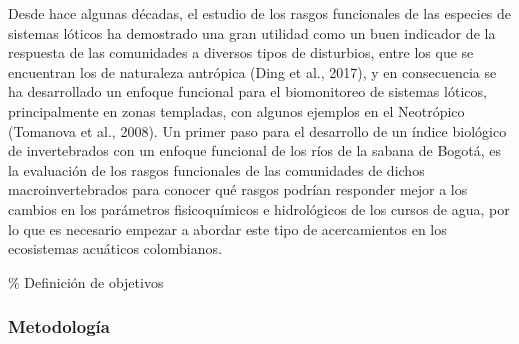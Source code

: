 \documentclass[
]{article}
\begin{document}
Desde hace algunas décadas, el estudio de los rasgos funcionales de las
especies de sistemas lóticos ha demostrado una gran utilidad como un
buen indicador de la respuesta de las comunidades a diversos tipos de
disturbios, entre los que se encuentran los de naturaleza antrópica
(Ding et al., 2017), y en consecuencia se ha desarrollado un enfoque
funcional para el biomonitoreo de sistemas lóticos, principalmente en
zonas templadas, con algunos ejemplos en el Neotrópico (Tomanova et al.,
2008). Un primer paso para el desarrollo de un índice biológico de
invertebrados con un enfoque funcional de los ríos de la sabana de
Bogotá, es la evaluación de los rasgos funcionales de las comunidades de
dichos macroinvertebrados para conocer qué rasgos podrían responder
mejor a los cambios en los parámetros fisicoquímicos e hidrológicos de
los cursos de agua, por lo que es necesario empezar a abordar este tipo
de acercamientos en los ecosistemas acuáticos colombianos.

\% Definición de objetivos

\begin{comment}
 Objetivos: 
 -Evaluar la respuesta de los rasgos funcionales y de la diversidad funcional
  de las comunidades de macroinvertebrados a la variación en la calidad 
  del agua en dos ríos de la Sabana de Bogotá.

 -Establecer los rasgos funcionales de las comunidades de macroinvertebrados
  que reflejen mejor los cambios físicos, químicos e hidrológicos de los ríos
  Neusa y Frío.

 -Comparar la respuesta de los rasgos funcionales de los macroinvertebrados 
  ante los cambios en las variables fisicoquímicas del agua con la obtenida 
  por medio de otras variables tradicionalmente medidas en dichos indicadores
  biológicos.
\end{comment}

\hypertarget{metodologuxeda}{%
\subsubsection{Metodología}\label{metodologuxeda}}
\end{document}

